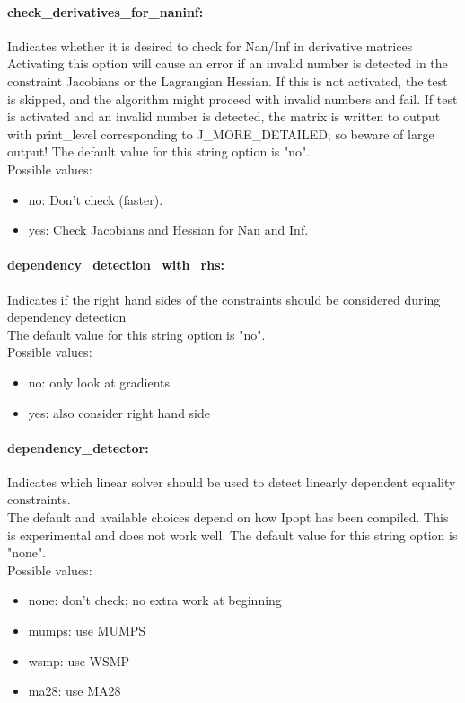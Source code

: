 \paragraph{check\_derivatives\_for\_naninf:}\label{opt:check_derivatives_for_naninf} Indicates whether it is desired to check for Nan/Inf in derivative matrices \\
 Activating this option will cause an error if an invalid number is detected in the constraint Jacobians or the Lagrangian Hessian.  If this is not activated, the test is skipped, and the algorithm might proceed with invalid numbers and fail.  If test is activated and an invalid number is detected, the matrix is written to output with print\_level corresponding to J\_MORE\_DETAILED; so beware of large output! The default value for this string option is "no".
\\ 
Possible values:
\begin{itemize}
   \item no: Don't check (faster).
   \item yes: Check Jacobians and Hessian for Nan and Inf.
\end{itemize}

\paragraph{dependency\_detection\_with\_rhs:}\label{opt:dependency_detection_with_rhs} Indicates if the right hand sides of the constraints should be considered during dependency detection \\
 The default value for this string option is "no".
\\ 
Possible values:
\begin{itemize}
   \item no: only look at gradients
   \item yes: also consider right hand side
\end{itemize}

\paragraph{dependency\_detector:}\label{opt:dependency_detector} Indicates which linear solver should be used to detect linearly dependent equality constraints. \\
 The default and available choices depend on how Ipopt has been compiled.  This is experimental and does not work well. The default value for this string option is "none".
\\ 
Possible values:
\begin{itemize}
   \item none: don't check; no extra work at beginning
   \item mumps: use MUMPS
   \item wsmp: use WSMP
   \item ma28: use MA28
\end{itemize}

